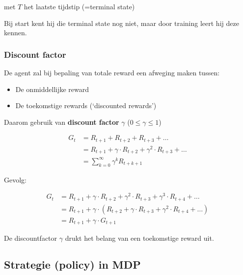 \documentclass{article}
\begin{document}
\begin{center}
    met $T$ het laatste tijdstip (=terminal state)
\end{center}

Bij start kent hij die terminal state nog niet, maar door training leert hij deze kennen.

\subsubsection{Discount factor}

De agent zal bij bepaling van totale reward een afweging maken tussen:

\begin{itemize}
    \item De onmiddellijke reward
    \item De toekomstige rewards (`discounted rewards')
\end{itemize}

Daarom gebruik van \textbf{discount factor} $\gamma$ ($0 \leq \gamma \leq 1$)

\begin{equation}
    \begin{aligned}
        G_t &= R_{t+1} + R_{t+2} + R_{t+3} + \dots \\
        &= R_{t+1} + \gamma \cdot R_{t+2} + \gamma^2 \cdot R_{t+3} + \dots \\
        &= \sum_{k=0}^{\infty} \gamma^k R_{t+k+1}
    \end{aligned}
\end{equation}

Gevolg:

\begin{equation}
    \begin{aligned}
        G_t &= R_{t+1} + \gamma \cdot R_{t+2} + \gamma^2 \cdot R_{t+3} + \gamma^3 \cdot R_{t+4} + \dots \\
        &= R_{t+1} + \gamma \cdot (R_{t+2} + \gamma \cdot R_{t+3} + \gamma^2 \cdot R_{t+4} + \dots) \\
        &= R_{t+1} + \gamma \cdot G_{t+1}
    \end{aligned}
\end{equation}

De discountfactor $\gamma$ drukt het belang van een toekomstige reward uit.

\subsection{Strategie (policy) in MDP}
\end{document}

